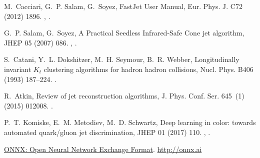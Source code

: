 \documentclass[final,5p,times,twocolumn]{elsarticle}
\begin{document}
\begin{thebibliography}{10}
M.~Cacciari, G.~P. Salam, G.~Soyez, {FastJet User Manual}, Eur. Phys. J. C72
  (2012) 1896.
\newblock \href {http://arxiv.org/abs/1111.6097} {},
  \href {http://dx.doi.org/10.1140/epjc/s10052-012-1896-2}
  {}.

G.~P. Salam, G.~Soyez, {A Practical Seedless Infrared-Safe Cone jet algorithm},
  JHEP 05 (2007) 086.
\newblock \href {http://arxiv.org/abs/0704.0292} {},
  \href {http://dx.doi.org/10.1088/1126-6708/2007/05/086}
  {}.

S.~Catani, Y.~L. Dokshitzer, M.~H. Seymour, B.~R. Webber, {Longitudinally
  invariant $K_t$ clustering algorithms for hadron hadron collisions}, Nucl.
  Phys. B406 (1993) 187--224.
\newblock \href {http://dx.doi.org/10.1016/0550-3213(93)90166-M}
  {}.

R.~Atkin, {Review of jet reconstruction algorithms}, J. Phys. Conf. Ser.
  645~(1) (2015) 012008.
\newblock \href {http://dx.doi.org/10.1088/1742-6596/645/1/012008}
  {}.

P.~T. Komiske, E.~M. Metodiev, M.~D. Schwartz, {Deep learning in color: towards
  automated quark/gluon jet discrimination}, JHEP 01 (2017) 110.
\newblock \href {http://arxiv.org/abs/1612.01551} {},
  \href {http://dx.doi.org/10.1007/JHEP01(2017)110}
  {}.

\href{http://onnx.ai}{{ONNX: Open Neural Network Exchange Format}}.
\newline\urlprefix\url{http://onnx.ai}

\end{thebibliography}
\end{document}
